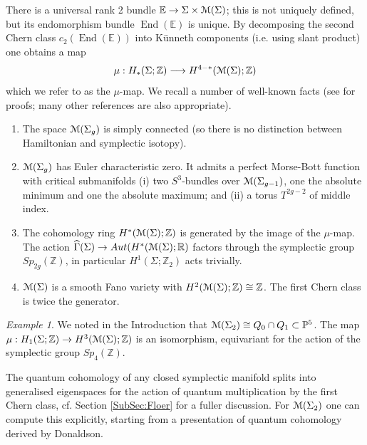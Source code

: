 \documentclass[reqno,10pt]{amsart}
\numberwithin{equation}{section}
\newcommand{\bE}{{\mathbb E}}
\newcommand{\bP}{{\mathbb P}}
\newcommand{\bR}{{\mathbb R}}
\newcommand{\bZ}{{\mathbb Z}}
\newcommand{\scrM}{\EuScript{M}}
\newcommand{\End}{\operatorname{End}}
\theoremstyle{remark}
\newtheorem{Example}[thm]{Example}
\begin{document}
 There is a universal rank 2 bundle $\bE \rightarrow \Sigma\times\scrM(\Sigma)$; this is not uniquely defined, but its endomorphism bundle $\End(\bE)$ is unique.  By decomposing the second Chern class $c_2(\End(\bE))$ into K\"unneth components (i.e. using slant product) one obtains a map
\begin{equation}\label{Equation:mu}
\mu: H_*(\Sigma;\bZ) \longrightarrow H^{4-*}(\scrM(\Sigma);\bZ)
\end{equation}
which we refer to as the $\mu$-map.   We recall a number of well-known facts (see \cite{Thaddeus:Notes, Newstead, Donaldson, GH} for proofs; many other references are also appropriate).

\begin{enumerate}
\item  The space $\scrM(\Sigma_g)$ is simply connected (so there is no distinction between Hamiltonian and symplectic isotopy).  
\item $\scrM(\Sigma_g)$ has  Euler characteristic zero.  It admits a perfect Morse-Bott function with critical submanifolds (i) two $S^3$-bundles over $\scrM(\Sigma_{g-1})$, one the absolute minimum and one the absolute maximum; and (ii) a torus $T^{2g-2}$ of middle index.  
\item The cohomology ring $H^*(\scrM(\Sigma);\bZ)$ is generated by the image of the $\mu$-map. The action $\widehat\Gamma(\Sigma) \rightarrow Aut(H^*(\scrM(\Sigma);\bR)$ factors through the symplectic group $Sp_{2g}(\bZ)$, in particular $H^1(\Sigma;\bZ_2)$ acts trivially. 
\item $\scrM(\Sigma)$ is a smooth Fano variety with $H^2(\scrM(\Sigma);\bZ) \cong \bZ$. The first Chern class is twice the generator. 
\end{enumerate}


\begin{Example} \label{Ex:RingIsoQH}
We noted in the Introduction that $\scrM(\Sigma_2) \cong Q_0\cap Q_1 \subset \bP^5$.   The map $\mu: H_1(\Sigma;\bZ) \rightarrow H^3(\scrM(\Sigma);\bZ)$ is an isomorphism,  equivariant for the action of the symplectic group $Sp_4(\bZ)$. 
\end{Example}

The quantum cohomology of any closed symplectic manifold splits into generalised eigenspaces for the action of quantum multiplication by the first Chern class, cf. Section \ref{SubSec:Floer} for a fuller discussion.  For $\scrM(\Sigma_2)$ one can compute this explicitly, starting from a presentation of quantum cohomology derived by Donaldson.
\end{document}
